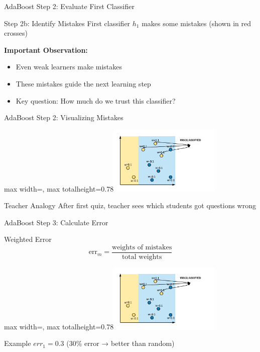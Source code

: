 \documentclass[9pt]{beamer}
\newcommand{\fitpic}[1]{\begin{adjustbox}{max width=\linewidth, max totalheight=0.78\textheight}#1\end{adjustbox}}
\begin{document}
\begin{frame}{AdaBoost Step 2: Evaluate First Classifier}
\begin{alertbox}{Step 2b: Identify Mistakes}
First classifier $h_1$ makes some mistakes (shown in red crosses)
\end{alertbox}

\begin{keypointsbox}
\textbf{Important Observation:}
\begin{itemize}
\item Even weak learners make mistakes
\item These mistakes guide the next learning step
\item Key question: How much do we trust this classifier?
\end{itemize}
\end{keypointsbox}
\end{frame}

\begin{frame}{AdaBoost Step 2: Visualizing Mistakes}
  \vspace{0.3cm}
  \centering
  \fitpic{\includegraphics[width = 0.4\textwidth]{../assets/ensemble/diagrams/ada_iter1_misclassify}}

\begin{examplebox}{Teacher Analogy}
After first quiz, teacher sees which students got questions wrong
\end{examplebox}
\end{frame}

\begin{frame}{AdaBoost Step 3: Calculate Error}
\begin{definitionbox}{Weighted Error}
$$\text{err}_m = \frac{\text{weights of mistakes}}{\text{total weights}}$$
\end{definitionbox}

\begin{center}
\fitpic{\includegraphics[width = 0.4\textwidth]{../assets/ensemble/diagrams/ada_iter1_misclassify}}
\end{center}

\begin{examplebox}{Example}
$err_1 = 0.3$ (30\% error → better than random)
\end{examplebox}
\end{frame}
\end{document}
